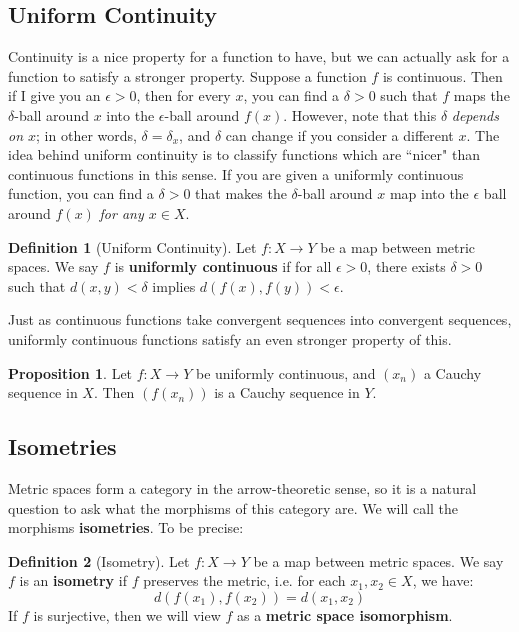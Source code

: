 \documentclass[11pt, oneside]{amsart}   	%
\theoremstyle{definition}
\newtheorem{definition}{Definition}[section]
\newtheorem{prop}{Proposition}[section]
\begin{document}
	\subsection{Uniform Continuity}
	
	Continuity is a nice property for a function to have, but we can actually ask for a function to satisfy a stronger property. Suppose a function $f$ is continuous.  
	Then if I give you an $\epsilon > 0$, then for every $x$, you can find a $\delta > 0$ such that $f$ maps the $\delta$-ball around $x$ into the $\epsilon$-ball 
	around $f(x)$. However, note that this $\delta$ \textit{depends on $x$}; in other words, $\delta = \delta_x$, and $\delta$ can change if you consider a different 
	$x$. The idea behind uniform continuity is to classify functions which are ``nicer" than continuous functions in this sense. If you are given a uniformly 
	continuous function, you can find a $\delta > 0$ that makes the $\delta$-ball around $x$ map into the $\epsilon$ ball around $f(x)$ \textit{for any $x\in X$}. 
	
	\begin{definition}[Uniform Continuity]
		Let $f : X\rightarrow Y$ be a map between metric spaces. We say $f$ is \textbf{uniformly continuous} if for all $\epsilon > 0$, there exists $\delta > 0$ 
		such that $d(x, y) < \delta$ implies $d(f(x), f(y)) < \epsilon$. 
	\end{definition}
	
	Just as continuous functions take convergent sequences into convergent sequences, uniformly continuous functions satisfy an even stronger property of 
	this. 
	
	\begin{prop}
		Let $f : X\rightarrow Y$ be uniformly continuous, and $(x_n)$ a Cauchy sequence in $X$. Then $(f(x_n))$ is a Cauchy sequence in $Y$. 
	\end{prop}
	
	\subsection{Isometries}
	
	Metric spaces form a category in the arrow-theoretic sense, so it is a natural question to ask what the morphisms of this category are. We will call the 
	morphisms \textbf{isometries}. To be precise:
	
	\begin{definition}[Isometry]
		Let $f : X\rightarrow Y$ be a map between metric spaces. We say $f$ is an \textbf{isometry} if $f$ preserves the metric, i.e. for each $x_1, x_2
		\in X$, we have:
		$$
			d(f(x_1), f(x_2)) = d(x_1, x_2)
		$$
		If $f$ is surjective, then we will view $f$ as a \textbf{metric space isomorphism}.
	\end{definition}
	
\end{document}
